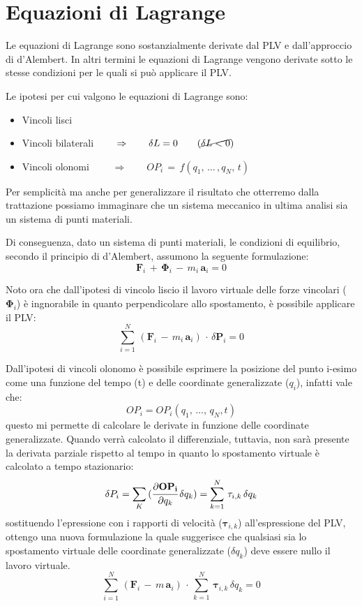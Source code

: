 \section{Equazioni di Lagrange}

Le equazioni di Lagrange sono sostanzialmente derivate dal PLV e dall'approccio di d'Alembert. In altri termini le equazioni di Lagrange vengono derivate sotto le stesse condizioni per le quali si può applicare il PLV.

Le ipotesi per cui valgono le equazioni di Lagrange sono:
\begin{itemize}
\item Vincoli lisci
\item Vincoli bilaterali $\qquad\Rightarrow\qquad \delta L = 0\qquad(\cancel{\delta L < 0})$
\item Vincoli olonomi $\qquad\Rightarrow\qquad OP_i\,=\,f(q_1,\,\dots\,,q_N,\,t)$
\end{itemize}

Per semplicità ma anche per generalizzare il risultato che otterremo dalla trattazione possiamo immaginare che un sistema meccanico in ultima analisi sia un sistema di punti materiali.

Di conseguenza, dato un sistema di punti materiali, le condizioni di equilibrio, secondo il principio di d'Alembert, assumono la seguente formulazione:
\[\mathbf{F}_i\,+\,\mathbf{\Phi}_i\,-\,m_i\,\mathbf{a}_i = 0\]

Noto ora che dall'ipotesi di vincolo liscio il lavoro virtuale delle forze vincolari ($\mathbf{\Phi}_i$) è ingnorabile in quanto perpendicolare allo spostamento, è possibile applicare il PLV:
\[\sum_{i=1}^N\,(\mathbf{F}_i\,-\,m_i\,\mathbf{a}_i)\,\cdot\,\delta \mathbf{P}_i=0\]

Dall'ipotesi di vincoli olonomo è possibile esprimere la posizione del punto i-esimo come una funzione del tempo (t) e delle coordinate generalizzate ($q_i$), infatti vale che:
\[OP_i = OP_i(q_1,\,\dots,\,q_N, t)\]
questo mi permette di calcolare le derivate in funzione delle coordinate generalizzate. Quando verrà calcolato il differenziale, tuttavia, non sarà presente la derivata parziale rispetto al tempo in quanto lo spostamento virtuale è calcolato a tempo stazionario:
\[\delta P_i = \sum_K\,(\cfrac{\partial\mathbf{OP_i}}{\partial q_k}\,\delta q_k) = \sum_{k=1}^N\,\mathbf{\tau}_{i,k}\,\delta q_k\]
sostituendo l'epressione con i rapporti di velocità ($\mathbf{\tau}_{i,k}$) all'espressione del PLV, ottengo una nuova formulazione la quale suggerisce che qualsiasi sia lo spostamento virtuale delle coordinate generalizzate ($\delta q_k$) deve essere nullo il lavoro virtuale. 
\[\sum_{i=1}^N\,(\mathbf{F}_i\,-\,m\,\mathbf{a}_i)\,\cdot\,\sum_{k=1}^N\,\mathbf{\tau}_{i,k}\,\delta q_k = 0\]

